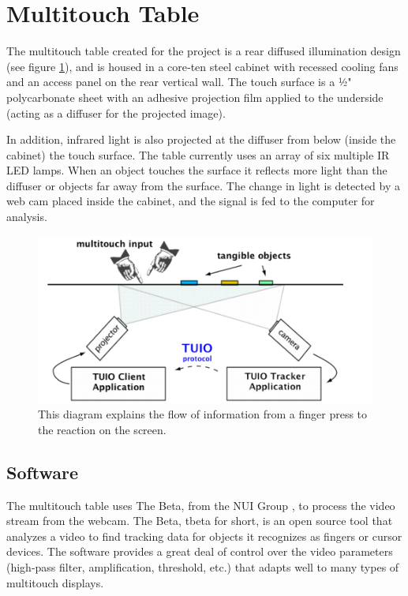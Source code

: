 \section{Multitouch Table}
The multitouch table created for the project is a rear diffused illumination design (see figure \ref{fig:mtdiagram}), and is housed in a core‐ten steel cabinet with recessed cooling fans and an access panel on the rear vertical wall.  The touch surface is a 1⁄2" polycarbonate sheet with an adhesive projection film applied to the underside (acting as a diffuser for the projected image).  

In addition, infrared light is also projected at the diffuser from below (inside the cabinet) the touch surface. The table currently uses an array of six multiple IR LED lamps. When an object touches the surface it reflects more light than the diffuser or objects far away from the surface. The change in light is detected by a web cam placed inside the cabinet, and the signal is fed to the computer for analysis.

\begin{figure}[htp]\centering
  \includegraphics[width=.8\textwidth]{images/mt-diagram.png}
  \caption{This diagram explains the flow of information from a finger press to the reaction on the screen. \cite{REACT}}\label{fig:mtdiagram}
\end{figure}
\subsection{Software}
The multitouch table uses The Beta, from the NUI Group \cite{NUI}, to process the video stream from the webcam. The Beta, tbeta for short, is an open source tool that analyzes a video to find tracking data for objects it recognizes as fingers or cursor devices. The software provides a great deal of control over the video parameters (high-pass filter, amplification, threshold, etc.) that adapts well to many types of multitouch displays.

